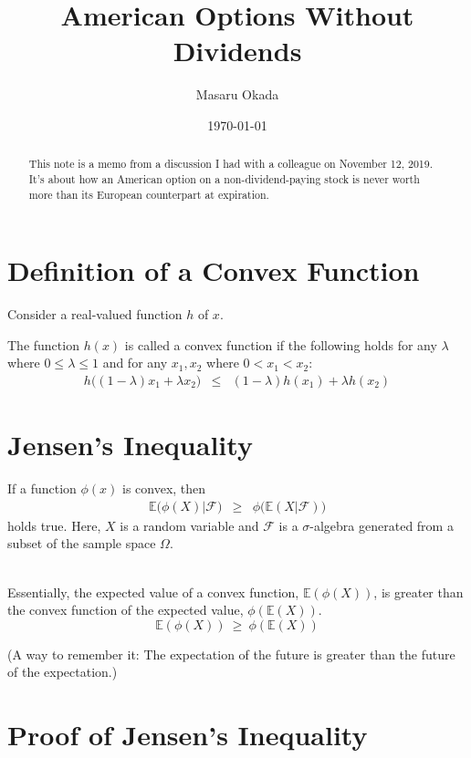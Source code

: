 \documentclass[uplatex,a4j,12pt,dvipdfmx]{jsarticle}
\title{
American Options Without Dividends
}
\author{Masaru Okada}
\date{\today}
\begin{document}
\maketitle

\begin{abstract}
	This note is a memo from a discussion I had with a colleague on November 12, 2019. It's about how an American option on a non-dividend-paying stock is never worth more than its European counterpart at expiration.
\end{abstract}

\section{Definition of a Convex Function}

Consider a real-valued function $h$ of $x$.

The function $h(x)$ is called a convex function if the following holds for any $\lambda$ where $0 \leq \lambda \leq 1$ and for any $x_1, x_2$ where $0 < x_1 < x_2$:
%
%
\begin{eqnarray*}
	h \Big( (1- \lambda) x_{1} + \lambda x_{2} \Big)
	&\leq&
	(1- \lambda) h(x_{1}) + \lambda h(x_{2})
\end{eqnarray*}
%
%

\section{Jensen's Inequality}

If a function $\phi(x)$ is convex, then
%
%
\begin{eqnarray*}
	\mathbb{E} \Big( \phi(X) \Big| \mathcal{F} \Big)
	&\geq&
	\phi \Big( \mathbb{E}(X|\mathcal{F}) \Big)
\end{eqnarray*}
%
%
holds true.
Here, $X$ is a random variable and $\mathcal{F}$ is a $\sigma$-algebra generated from a subset of the sample space $\Omega$.

\ \\

Essentially, the expected value of a convex function, $\mathbb{E}(\phi(X))$, is greater than the convex function of the expected value, $\phi(\mathbb{E}(X))$.
$$
	\mathbb{E}(\phi(X))
	\ \geq \
	\phi(\mathbb{E}(X))
$$

(A way to remember it: The expectation of the future is greater than the future of the expectation.)


\section{Proof of Jensen's Inequality}
\end{document}
